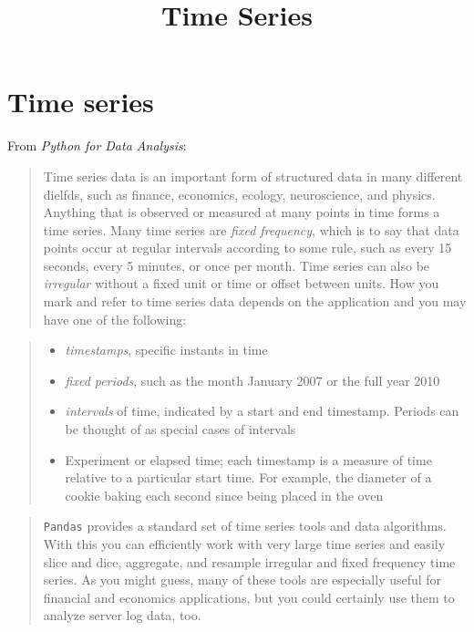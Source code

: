 \documentclass{article}
\title{Time Series}
\begin{document}
    
    
    \maketitle
    
    

    
    \section{Time series}\label{time-series}

    From \emph{Python for Data Analysis}:

\begin{quote}
Time series data is an important form of structured data in many
different dielfds, such as finance, economics, ecology, neuroscience,
and physics. Anything that is observed or measured at many points in
time forms a time series. Many time series are \emph{fixed frequency},
which is to say that data points occur at regular intervals according to
some rule, such as every 15 seconds, every 5 minutes, or once per month.
Time series can also be \emph{irregular} without a fixed unit or time or
offset between units. How you mark and refer to time series data depends
on the application and you may have one of the following:
\end{quote}

\begin{quote}
\begin{itemize}
\itemsep1pt\parskip0pt
\item
  \emph{timestamps}, specific instants in time
\item
  \emph{fixed periods}, such as the month January 2007 or the full year
  2010
\item
  \emph{intervals} of time, indicated by a start and end timestamp.
  Periods can be thought of as special cases of intervals
\item
  Experiment or elapsed time; each timestamp is a measure of time
  relative to a particular start time. For example, the diameter of a
  cookie baking each second since being placed in the oven
\end{itemize}
\end{quote}

\begin{quote}
\texttt{Pandas} provides a standard set of time series tools and data
algorithms. With this you can efficiently work with very large time
series and easily slice and dice, aggregate, and resample irregular and
fixed frequency time series. As you might guess, many of these tools are
especially useful for financial and economics applications, but you
could certainly use them to analyze server log data, too.
\end{quote}
\end{document}
